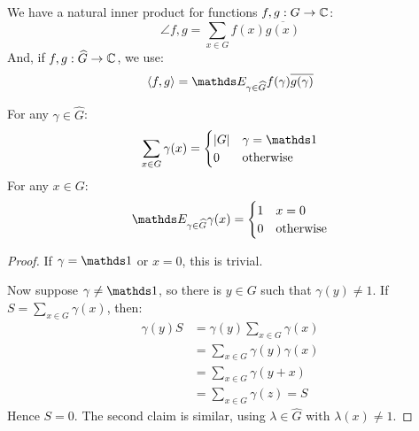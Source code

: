 \documentclass[10pt,a4paper]{article}
\begin{document}
We have a natural inner product for functions $f,g:G\to \mathbb{C}$:
\[\angle{f, g} = \sum_{x \in G} f(x)\overline{g(x)}\]
And, if $f,g : \widehat{G} \to \mathbb{C}$, we use:
\[\angle{f,g} = \E_{\gamma \in \hat{G}} f(\gamma)\overline{g(\gamma)}\]
\begin{lemma}[Orthoganality]
  For any $\gamma \in \hat{G}$:
  \[\sum_{x \in G} \gamma(x) = \begin{cases} |G| & \gamma = \one \\ 0 & \ow\end{cases}\]
  For any $x \in G$:
  \[\E_{\gamma \in \hat{G}} \gamma(x) = \begin{cases} 1 & x = 0\\ 0 & \ow\end{cases}\]
\end{lemma}
\begin{proof}
  If $\gamma= \one$ or $x = 0$, this is trivial.

  Now suppose $\gamma \neq \one$, so there is $y \in G$ such that $\gamma(y) \neq 1$. If $S = \sum_{x\in G}\gamma(x)$, then:
  \begin{align*}
    \gamma(y)S &= \gamma(y)\sum_{x\in G} \gamma(x)\\
    &= \sum_{x \in G} \gamma(y)\gamma(x)\\
    &=  \sum_{x\in G} \gamma(y+x)\\
    &= \sum_{x\in G} \gamma(z) = S
  \end{align*}
  Hence $S = 0$. The second claim is similar, using $\lambda \in \hat{G}$ with $\lambda(x) \neq 1$.
\end{proof}
\end{document}
